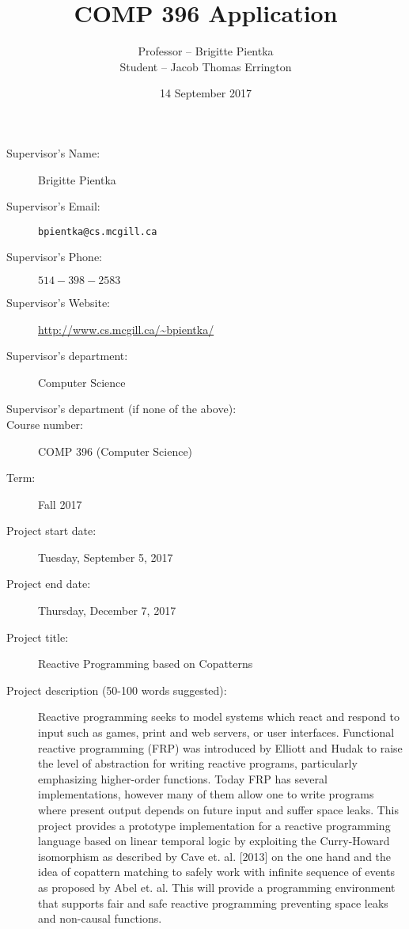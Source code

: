 \documentclass[8pt,letterpaper]{article}
\title{COMP 396 Application}
\author{Professor -- Brigitte Pientka\\Student -- Jacob Thomas Errington}
\date{14 September 2017}
\begin{document}
\maketitle

\begin{description}
    \item[Supervisor's Name:] Brigitte Pientka
    \item[Supervisor's Email:] \texttt{bpientka@cs.mcgill.ca}
    \item[Supervisor's Phone:] $514-398-2583$
    \item[Supervisor's Website:] \url{http://www.cs.mcgill.ca/~bpientka/}
    \item[Supervisor's department:] Computer Science
    \item[Supervisor's department (if none of the above):]
    \item[Course number:] COMP 396 (Computer Science)
    \item[Term:] Fall 2017
    \item[Project start date:] Tuesday, September 5, 2017
    \item[Project end date:] Thursday, December 7, 2017
    \item[Project title:] Reactive Programming based on Copatterns
    \item[Project description (50-100 words suggested):]

        Reactive programming seeks to model systems which react and respond to
        input such as games, print and web servers, or user interfaces.
        Functional reactive programming (FRP) was introduced by Elliott and
        Hudak  to raise the level of abstraction for writing reactive programs,
        particularly emphasizing higher-order functions. Today FRP has several
        implementations, however many of them allow one to write programs where
        present output depends on future input and suffer space leaks. This
        project provides a prototype implementation for a reactive programming
        language based on linear temporal logic by exploiting the Curry-Howard
        isomorphism as described by Cave et. al. [2013] on the one hand and the
        idea of copattern matching to safely work with infinite sequence of
        events as proposed by Abel et. al. This will provide a programming
        environment that supports fair and safe reactive programming preventing
        space leaks and non-causal functions.


\end{description}
\end{document}
